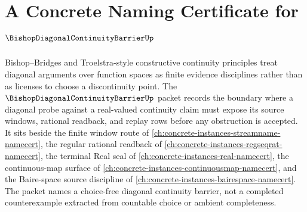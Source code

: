 \chapter{A Concrete Naming Certificate for $\BishopDiagonalContinuityBarrierUp$}
\label{ch:concrete-instances-bishop-diagonal-continuity-barrier-namecert}

Bishop--Bridges and Troelstra-style constructive continuity principles treat diagonal arguments over function spaces as finite evidence disciplines rather than as licenses to choose a discontinuity point. The $\BishopDiagonalContinuityBarrierUp$ packet records the boundary where a diagonal probe against a real-valued continuity claim must expose its source windows, rational readback, and replay rows before any obstruction is accepted. It sits beside the finite window route of \autoref{ch:concrete-instances-streamname-namecert}, the regular rational readback of \autoref{ch:concrete-instances-regseqrat-namecert}, the terminal Real seal of \autoref{ch:concrete-instances-real-namecert}, the continuous-map surface of \autoref{ch:concrete-instances-continuousmap-namecert}, and the Baire-space source discipline of \autoref{ch:concrete-instances-bairespace-namecert}. The packet names a choice-free diagonal continuity barrier, not a completed counterexample extracted from countable choice or ambient completeness.

